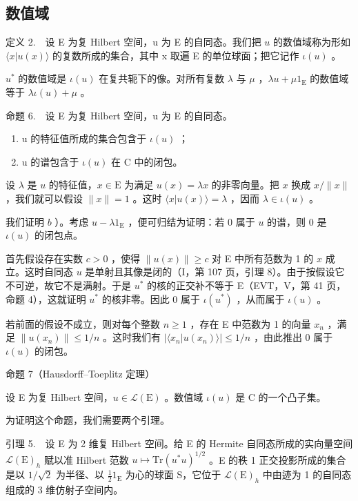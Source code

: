 \subsection{数值域}

定义 2.　设 E 为复 Hilbert 空间，u 为 E 的自同态。我们把 \(u\) 的数值域称为形如 \(\langle x|u(x)\rangle\) 的复数所成的集合，其中 x 取遍 E 的单位球面；把它记作 \(\iota(u)\) 。

\(u^{*}\) 的数值域是 \(\iota(u)\) 在复共轭下的像。对所有复数 \(\lambda\) 与 \(\mu\) ，\(\lambda u + \mu 1_{\mathrm{E}}\) 的数值域等于 \(\lambda \iota(u) + \mu\) 。

命题 6.　设 E 为复 Hilbert 空间，u 为 E 的自同态。

\begin{enumerate}
\def\labelenumi{\alph{enumi})}
\item
  u 的特征值所成的集合包含于 \(\iota(u)\) ；
\item
  u 的谱包含于 \(\iota(u)\) 在 C 中的闭包。
\end{enumerate}

设 \(\lambda\) 是 \(u\) 的特征值，\(x \in \mathrm{E}\) 为满足 \(u(x) = \lambda x\) 的非零向量。把 \(x\) 换成 \(x / \| x\|\) ，我们就可以假设 \(\| x \| = 1\) 。这时 \(\langle x | u(x) \rangle = \lambda\) ，因而 \(\lambda \in \iota(u)\) 。

我们证明 \(b\) ）。考虑 \(u - \lambda 1_{\mathrm{E}}\) ，便可归结为证明：若 0 属于 \(u\) 的谱，则 0 是 \(\iota(u)\) 的闭包点。

首先假设存在实数 \(c > 0\) ，使得 \(\| u(x)\| \geqslant c\) 对 E 中所有范数为 1 的 \(x\) 成立。这时自同态 \(u\) 是单射且其像是闭的（I，第 107 页，引理 8）。由于按假设它不可逆，故它不是满射。于是 \(u^{*}\) 的核的正交补不等于 E（EVT，V，第 41 页，命题 4），这就证明 \(u^{*}\) 的核非零。因此 0 属于 \(\iota(u^{*})\) ，从而属于 \(\iota(u)\) 。

若前面的假设不成立，则对每个整数 \(n \geqslant 1\) ，存在 E 中范数为 1 的向量 \(x_{n}\) ，满足 \(\|u(x_{n})\| \leqslant 1/n\) 。这时我们有 \(|\langle x_{n}|u(x_{n})\rangle| \leqslant 1/n\) ，由此推出 0 属于 \(\iota(u)\) 的闭包。

命题 7（Hausdorff–Toeplitz 定理）

设 E 为复 Hilbert 空间，\(u \in \mathcal{L}(\mathrm{E})\) 。数值域 \(\iota(u)\) 是 C 的一个凸子集。

为证明这个命题，我们需要两个引理。

引理 5.　设 E 为 2 维复 Hilbert 空间。给 E 的 Hermite 自同态所成的实向量空间 \(\mathcal{L}(\mathrm{E})_h\) 赋以准 Hilbert 范数 \(u \mapsto \mathrm{Tr}(u^* u)^{1/2}\) 。E 的秩 1 正交投影所成的集合是以 \(1/\sqrt{2}\) 为半径、以 \(\frac{1}{2} 1_{\mathrm{E}}\) 为心的球面 S，它位于 \(\mathcal{L}(\mathrm{E})_h\) 中由迹为 1 的自同态组成的 3 维仿射子空间内。

